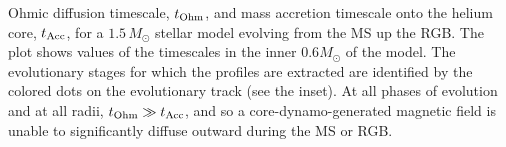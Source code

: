 \label{fig:timescales}
Ohmic diffusion timescale, $t_{\rm Ohm}$, and mass accretion timescale onto the helium core, $t_{\rm Acc}$, for a $1.5 \, M_\odot$ stellar model evolving from the MS up the RGB. The plot shows values of the timescales in the inner $0.6 M_\odot$ of the model. The evolutionary stages for which the profiles are extracted are identified by the colored dots on the evolutionary track (see the inset). At all phases of evolution and at all radii, $t_{\rm Ohm} \gg t_{\rm Acc}$, and so a core-dynamo-generated magnetic field is unable to significantly diffuse outward during the MS or RGB.
  
